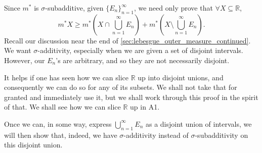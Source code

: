 \documentclass[notoc,notitlepage]{tufte-book}
\begin{document}
\begin{strategy}
  Since $m^*$ is $\sigma$-subadditive, given $\{ E_n \}_{n=1}^{\infty}$, we need
  only prove that $\forall X \subseteq \mathbb{R}$,
  \begin{equation*}
    m^* X \geq m^* \left( X \cap \bigcup_{n=1}^{\infty} E_n \right) + m^* \left(
    X \setminus \bigcup_{n=1}^{\infty} E_n \right).
  \end{equation*}
  Recall our discussion near the end of
  \cref{sec:lebesgue_outer_measure_continued}. We want $\sigma$-additivity,
  especially when we are given a set of disjoint intervals. However, our $E_n$'s
  are arbitrary, and so they are not necessarily disjoint.

  It helps if one has seen how we can slice $\mathbb{R}$ up into disjoint
  unions, and consequently we can do so for any of its subsets. We shall not
  take that for granted and immediately use it, but we shall work through this
  proof in the spirit of that. We shall see how we can slice $\mathbb{R}$ up in
  A1.

  Once we can, in some way, express $\bigcup_{n=1}^{\infty} E_n$ as a disjoint
  union of intervals, we will then show that, indeed, we have
  $\sigma$-additivity instead of $\sigma$-subadditivity on this disjoint union.
\end{strategy}
\end{document}
